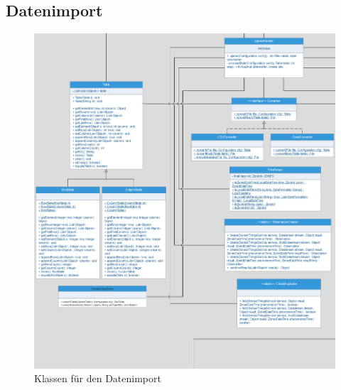 \subsection{Datenimport}
\begin{figure}[!h]
\centering
\includegraphics[scale=0.6]{uml/screenshots/upload}
\caption{Klassen für den Datenimport}
\end{figure}
\clearpage


\clearpage

\clearpage

\clearpage


\clearpage

\clearpage

\clearpage


\clearpage

\clearpage

\clearpage

\clearpage


\clearpage
